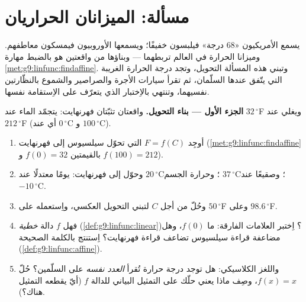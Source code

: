 \section{مسألة: الميزانان الحراريان}

\begin{problem}
\label{pb:g9:linfunc:1}
يسمع الأمريكيون «$68$ درجة» فيلبسون خفيفًا؛ ويسمعها الأوروبيون
فيمسكون معاطفهم. وميزانا الحرارة في العالم تربطهما
 --- وبناؤها من واقعتين هو بالضبط مهارة
\cref{met:g9:linfunc:findaffine}. وتبني هذه المسألة التحويل، وتجد
درجة الحرارة الغريبة التي يتّفق عندها السلّمان، ثم تقرأ سيارات
الأجرة والصراصير والشموع بالنظّارتين نفسيهما، وتنتهي بالاِختبار
الذي يتعرّف على الاِستقامة نفسها.

\medskip
\noindent\textbf{الجزء الأول --- بناء التحويل.}
واقعتان تثبّتان  فهرنهايت: يتجمّد الماء عند $32\,^\circ$F
ويغلي عند $212\,^\circ$F (أي عند $0\,^\circ$C
و $100\,^\circ$C).
\begin{enumerate}
  \item أوجِد  $F = f(C)$ التي تحوّل سيلسيوس
        إلى فهرنهايت (\cref{met:g9:linfunc:findaffine}
        بالقيمتين $f(0) = 32$ و $f(100) = 212$).
  \item وحوّل إلى فهرنهايت: يومًا معتدلًا عند $20\,^\circ$C؛
        وحرارة الجسم $37\,^\circ$C؛ وصقيعًا عند $-10\,^\circ$C.
  \item وحُلّ من أجل $C$ لتبني التحويل العكسي، واِستعمله على
        $50\,^\circ$F وعلى $98.6\,^\circ$F.
  \item فهل $f$ دالة \emph{خطية} (\cref{def:g9:linfunc:linear})؟
        اِختبر العلامات الفارقة: ما $f(0)$، وهل مضاعفة قراءة
        سيلسيوس تضاعف قراءة فهرنهايت؟ اِستنتج بالكلمة الصحيحة
        (\cref{def:g9:linfunc:affine}).
  \item واللغز الكلاسيكي: هل توجد درجة حرارة تُقرأ \emph{العدد
        نفسه} على السلّمين؟ حُلّ $f(x) = x$، وصِف ماذا يعني
        حلّك على التمثيل البياني للدالة $f$ (أيّ  يقطعه
        التمثيل هناك؟).
\end{enumerate}


\end{problem}
